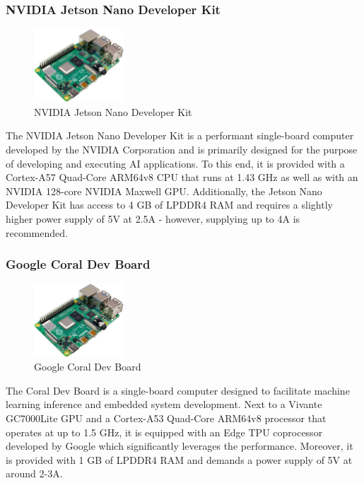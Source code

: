 \subsubsection{NVIDIA Jetson Nano Developer Kit}

\begin{figure}[h]
    \centering
    \includegraphics[width=0.30\textwidth]{./figures/mesh}
    \caption{NVIDIA Jetson Nano Developer Kit}
    \label{fig:jetson-nano}
\end{figure}

The NVIDIA Jetson Nano Developer Kit is a performant single-board computer developed by the NVIDIA Corporation and is primarily designed for the purpose of developing and executing AI applications. To this end, it is provided with a Cortex-A57 Quad-Core ARM64v8 CPU that runs at 1.43 GHz as well as with an NVIDIA 128-core NVIDIA Maxwell GPU. Additionally, the Jetson Nano Developer Kit has access to 4 GB of LPDDR4 RAM and requires a slightly higher power supply of 5V at 2.5A - however, supplying up to 4A is recommended.~\parencite{jetson-nano-devkit-manual}

\subsubsection{Google Coral Dev Board}

\begin{figure}[h]
    \centering
    \includegraphics[width=0.30\textwidth]{./figures/mesh}
    \caption{Google Coral Dev Board}
    \label{fig:coral-dev-board}
\end{figure}

The Coral Dev Board is a single-board computer designed to facilitate machine learning inference and embedded system development. Next to a Vivante GC7000Lite GPU and a Cortex-A53 Quad-Core ARM64v8 processor that operates at up to 1.5 GHz, it is equipped with an Edge TPU coprocessor developed by Google which significantly leverages the performance. Moreover, it is provided with 1 GB of LPDDR4 RAM and demands a power supply of 5V at around 2-3A.~\parencite{coral-dev-board-manual}


